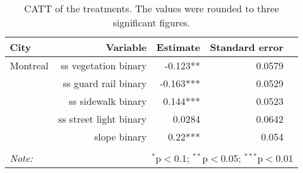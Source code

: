 \begin{table}[!htp]\centering
\caption{CATT of the treatments. The values were rounded to three significant figures.}\label{result:tab:cf}
\scriptsize
\begin{tabular}{lrrrr}\toprule
City&Variable&Estimate &Standard error \\ \midrule
Montreal & ss vegetation binary & -0.123** & 0.0579 \\
 & ss guard rail binary & -0.163*** & 0.0529 \\
 & ss sidewalk binary & 0.144*** & 0.0523 \\
 & ss street light binary & 0.0284 & 0.0642 \\
 & slope binary & 0.22*** & 0.054 \\
\hline
\hline \\[-1.8ex]
\textit{Note:}  & \multicolumn{5}{r}{$^{*}$p$<$0.1; $^{**}$p$<$0.05; $^{***}$p$<$0.01} \\
\end{tabular}
\end{table}
